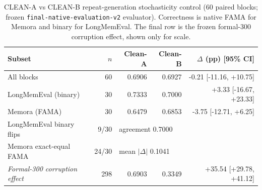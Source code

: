 \begin{table}[t]
\centering
\small
\caption{CLEAN-A vs CLEAN-B repeat-generation stochasticity control ($60$ paired blocks; frozen \texttt{final-native-evaluation-v2} evaluator). Correctness is native FAMA for Memora and binary for LongMemEval. The final row is the frozen formal-300 corruption effect, shown only for scale.}
\label{tab:clean-repeat-stochasticity}
\begin{tabular}{lrrrr}
\toprule
Subset & $n$ & Clean-A & Clean-B & $\Delta$ (pp) [95\% CI] \\
\midrule
All blocks & 60 & 0.6906 & 0.6927 & -0.21 [-11.16, +10.75] \\
LongMemEval (binary) & 30 & 0.7333 & 0.7000 & +3.33 [-16.67, +23.33] \\
Memora (FAMA) & 30 & 0.6479 & 0.6853 & -3.75 [-12.71, +6.25] \\
\midrule
LongMemEval binary flips & 9/30 & \multicolumn{3}{l}{agreement 0.7000} \\
Memora exact-equal FAMA & 24/30 & \multicolumn{3}{l}{mean $|\Delta|$ 0.1041} \\
\midrule
\textit{Formal-300 corruption effect} & 298 & 0.6903 & 0.3349 & +35.54 [+29.78, +41.12] \\
\bottomrule
\end{tabular}
\end{table}

